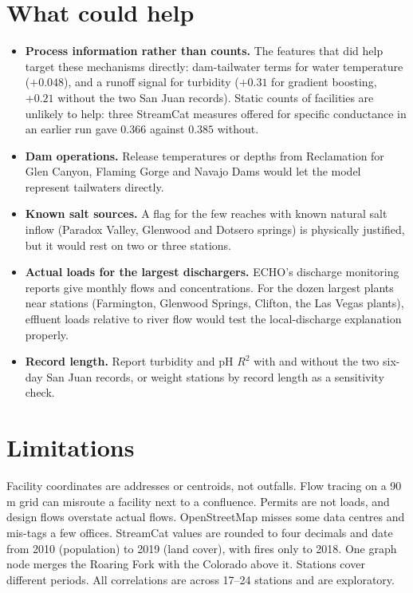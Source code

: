 \documentclass[11pt]{article}
\begin{document}
\section{What could help}\label{sec:next}

\begin{itemize}
  \item \textbf{Process information rather than counts.} The features that did help target these
        mechanisms directly: dam-tailwater terms for water temperature ($+0.048$), and a runoff
        signal for turbidity ($+0.31$ for gradient boosting, $+0.21$ without the two San Juan
        records). Static counts of facilities are
        unlikely to help: three StreamCat measures offered for specific conductance in an earlier
        run gave $0.366$ against $0.385$ without.
  \item \textbf{Dam operations.} Release temperatures or depths from Reclamation for Glen Canyon,
        Flaming Gorge and Navajo Dams would let the model represent tailwaters directly.
  \item \textbf{Known salt sources.} A flag for the few reaches with known natural salt inflow
        (Paradox Valley, Glenwood and Dotsero springs) is physically justified, but it would rest
        on two or three stations.
  \item \textbf{Actual loads for the largest dischargers.} ECHO's discharge monitoring reports give
        monthly flows and concentrations. For the dozen largest plants near stations (Farmington,
        Glenwood Springs, Clifton, the Las Vegas plants), effluent loads relative to river flow
        would test the local-discharge explanation properly.
  \item \textbf{Record length.} Report turbidity and pH $R^2$ with and without the two six-day San
        Juan records, or weight stations by record length as a sensitivity check.
\end{itemize}

\section{Limitations}

Facility coordinates are addresses or centroids, not outfalls. Flow tracing on a 90\,m grid can
misroute a facility next to a confluence. Permits are not loads, and design flows overstate actual
flows. OpenStreetMap misses some data centres and mis-tags a few offices. StreamCat values are
rounded to four decimals and date from 2010 (population) to 2019 (land cover), with fires only to
2018. One graph node merges the Roaring Fork with the Colorado above it. Stations cover different
periods. All correlations are across 17--24 stations and are exploratory.
\end{document}
